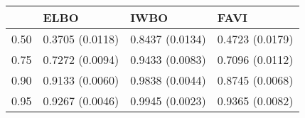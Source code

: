 \begin{tabular}{llll}
\toprule
{} &             ELBO &             IWBO &             FAVI \\
\midrule
0.50 &  0.3705 (0.0118) &  0.8437 (0.0134) &  0.4723 (0.0179) \\
0.75 &  0.7272 (0.0094) &  0.9433 (0.0083) &  0.7096 (0.0112) \\
0.90 &  0.9133 (0.0060) &  0.9838 (0.0044) &  0.8745 (0.0068) \\
0.95 &  0.9267 (0.0046) &  0.9945 (0.0023) &  0.9365 (0.0082) \\
\bottomrule
\end{tabular}

